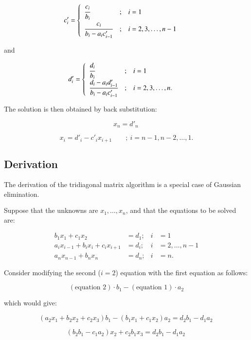 \documentclass[preprint,12pt,3p]{elsarticle}
\begin{document}
\[c'_i =
\begin{cases}
\begin{array}{lcl}
  \cfrac{c_i}{b_i}                  & ; & i = 1 \\
  \cfrac{c_i}{b_i - a_i c'_{i - 1}} & ; & i = 2, 3, \dots, n-1 \\
\end{array}
\end{cases}
\,\]

and

\[d'_i =
\begin{cases}
\begin{array}{lcl}
  \cfrac{d_i}{b_i}                  & ; & i = 1 \\
  \cfrac{d_i - a_i d'_{i - 1}}{b_i - a_i c'_{i - 1}} & ; & i = 2, 3, \dots, n. \\
\end{array}
\end{cases}
\,\]

The solution is then obtained by back substitution:

\[x_n = d'_n\,\]

\[x_i = d'_i - c'_i x_{i + 1} \qquad ; \ i = n - 1, n - 2, \ldots, 1.\]

\subsection{Derivation}\label{derivation}

The derivation of the tridiagonal matrix algorithm is a special case of Gaussian elimination.

Suppose that the unknowns are \(x_1,\ldots, x_n\), and that the
equations to be solved are:

\[\begin{align}
b_1 x_1 + c_1 x_2 & = d_1;& i & = 1 \\
a_i x_{i - 1} + b_i x_i  + c_i x_{i + 1} & = d_i;& i & = 2, \ldots, n - 1 \\
a_n x_{n - 1} + b_n x_n & = d_n;& i & = n.
\end{align}\]

Consider modifying the second (\(i = 2\)) equation with the first
equation as follows:

\[(\mbox{equation 2}) \cdot b_1 - (\mbox{equation 1}) \cdot a_2\]

which would give:

\[(a_2 x_1 + b_2 x_2  + c_2 x_3) b_1 - (b_1 x_1  + c_1 x_2) a_2 = d_2 b_1 - d_1 a_2
\,\]

\[(b_2 b_1 - c_1 a_2) x_2  + c_2 b_1 x_3 = d_2 b_1 - d_1 a_2
\,\]
\end{document}
